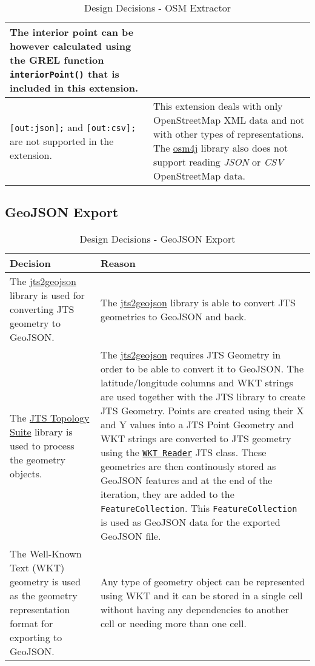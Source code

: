 \begin{table}[htbp]
\begin{tabularx}{\textwidth}{| X | X |}
        The interior point can be however calculated using the GREL function \texttt{interiorPoint()} that is included in this extension.\\ \hline
        \texttt{[out:json];} and \texttt{[out:csv];} are not supported in the extension. & This extension deals with only OpenStreetMap
        XML data and not with other types of representations. The \href{https://github.com/topobyte/osm4j}{osm4j} library also does not support reading
        \textit{JSON} or \textit{CSV} OpenStreetMap data.\\ \hline
    \end{tabularx}
    \caption{Design Decisions - OSM Extractor}
\end{table}
\pagebreak
\subsection{GeoJSON Export}
\begin{table}[htbp]
    \centering
    \small
    \begin{tabularx}{\textwidth}{| X | X |} \hline
        \textbf{Decision} & \textbf{Reason}\\[1cm] \hline
        The \href{https://github.com/bjornharrtell/jts2geojson}{jts2geojson} library is used for
        converting JTS geometry to GeoJSON. & The \href{https://github.com/bjornharrtell/jts2geojson}{jts2geojson} library is
        able to convert JTS geometries to GeoJSON and back. \\ \hline
        The \href{https://github.com/locationtech/jts}{JTS Topology Suite} library is used to process the geometry objects. &
        The \href{https://github.com/bjornharrtell/jts2geojson}{jts2geojson} requires JTS Geometry in order to be able to convert it to GeoJSON.
        The latitude/longitude columns and WKT strings are used together with the JTS library to create JTS Geometry.
        Points are created using their X and Y values into a JTS Point Geometry and WKT strings are converted to JTS geometry
        using the \href{https://locationtech.github.io/jts/javadoc/org/locationtech/jts/io/WKTReader.html}{\texttt{WKT Reader}}
        JTS class. These geometries are then continously stored as GeoJSON features and at the end of the iteration,
        they are added to the \texttt{FeatureCollection}.
        This \texttt{FeatureCollection} is used as GeoJSON data for the exported GeoJSON file.\\ \hline
        The Well-Known Text (WKT) geometry is used as the geometry representation format for exporting to GeoJSON. &
        Any type of geometry object can be represented using WKT and it can be stored in a single
        cell without having any dependencies to another cell or needing more than one cell. \\ \hline
    \end{tabularx}
    \caption{Design Decisions - GeoJSON Export}
\end{table}
\pagebreak
